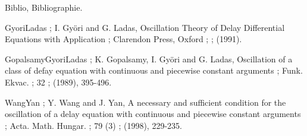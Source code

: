 \Sect Biblio, Bibliographie. 

{\eightpts
\DefRef GyoriLadas ; I. Gy{\"o}ri and G. Ladas, Oscillation Theory of Delay Differential Equations with Application ; Clarendon Press, Oxford ; { } ; $\!\!$(1991). 

\DefRef GopalsamyGyoriLadas ; K. Gopalsamy, I. Gy{\"o}ri and G. Ladas, Oscillation of a class of defay equation with continuous 
and piecewise constant arguments ; Funk. Ekvac. ; 32 ; (1989), 395-496. 

\DefRef WangYan ; Y. Wang and J. Yan, A necessary and sufficient condition for the oscillation of a delay equation with continuous and piecewise constant arguments ; Acta. Math. Hungar. ; 79 (3) ; (1998), 229-235. 
\par 
}
